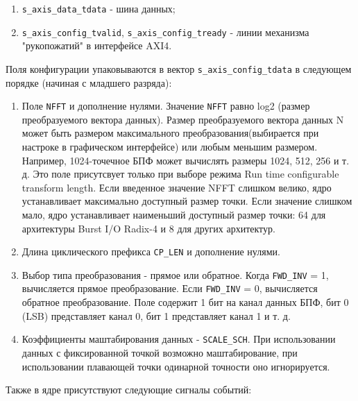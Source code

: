 \begin{enumerate}
	\item \verb|s_axis_data_tdata| - шина данных;
	\item \verb|s_axis_config_tvalid|, \verb|s_axis_config_tready| - линии механизма "рукопожатий" в интерфейсе AXI4.
\end{enumerate}

Поля конфигурации упаковываются в вектор \verb|s_axis_config_tdata| в следующем порядке (начиная с младшего разряда):

\begin{enumerate}
	\item Поле \verb|NFFT| и дополнение нулями. Значение \verb|NFFT| равно log2 (размер преобразуемого вектора данных). Размер преобразуемого вектора данных N может быть размером максимального преобразования(выбирается при настроке в графическом интерфейсе) или любым меньшим размером. Например, 1024-точечное БПФ может вычислять размеры 1024, 512, 256 и т. д. Это поле присутсвует только при выборе режима Run time configurable transform length. Если введенное значение NFFT слишком велико, ядро устанавливает максимально доступный размер точки. Если значение слишком мало, ядро устанавливает наименьший доступный размер точки: 64 для архитектуры Burst I/O Radix-4 и 8 для других архитектур. 
	\item Длина циклического префикса \verb|CP_LEN| и дополнение нулями.
	\item Выбор типа преобразования - прямое или обратное. Когда \verb|FWD_INV| = 1, вычисляется прямое преобразование. Если \verb|FWD_INV| = 0, вычисляется обратное преобразование. Поле содержит 1 бит на канал данных БПФ, бит 0 (LSB) представляет канал 0, бит 1 представляет канал 1 и т. д.
	\item Коэффициенты маштабирования данных - \verb|SCALE_SCH|. При использовании данных с фиксированной точкой возможно маштабирование, при использовании плавающей точки одинарной точности оно игнорируется.
\end{enumerate}

Также в ядре присутствуют следующие сигналы событий:

